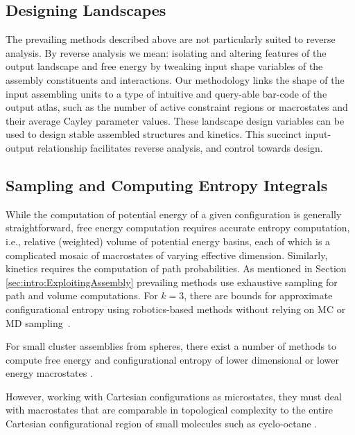 \documentclass[]{article}
\begin{document}
\subsection{Designing Landscapes} 
\label{sec:intro:designingAssembly} 
The prevailing methods described above are not particularly suited to reverse
analysis. By reverse analysis we mean: isolating and altering features of the
output landscape and free energy by tweaking input shape variables of the
assembly constituents and interactions. Our methodology links the shape of the
input assembling units to a type of intuitive and query-able bar-code of the
output atlas, such as the number of active constraint regions or macrostates
and their average Cayley parameter values. These landscape design variables
can be used to design stable assembled structures and kinetics. This succinct
input-output relationship facilitates reverse analysis, and control towards
design.

\subsection{Sampling and Computing Entropy Integrals} 
\label{sec:intro:VolumeIntegrals}
While the computation of potential energy of a given configuration is generally
straightforward, free energy computation requires accurate entropy computation,
i.e., relative (weighted) volume of potential energy basins, each of which is a
complicated mosaic of macrostates of varying effective dimension. Similarly,
kinetics requires the computation of path probabilities. As mentioned in
Section \ref{sec:intro:ExploitingAssembly} prevailing methods use exhaustive
sampling for path and volume computations. For $k=3$, there are bounds for
approximate configurational entropy using robotics-based methods without
relying on MC or MD sampling~\cite{GregoryS201199}. 

For small cluster assemblies from spheres, there exist a number of methods to
compute free energy and configurational entropy of lower dimensional or lower
energy macrostates \cite{Holmes-Cerfon2013, Arkus2009, Wales2010,
Beltran-Villegas2011, Calvo2012, Khan2012, Hoy2012, Hoy2014,
Holmes-Cerfon-2018}.

However, working with Cartesian configurations as microstates, they must deal
with macrostates that are comparable in topological complexity to the entire
Cartesian configurational region of small molecules such as cyclo-octane
\cite{Martin2010,Jaillet2017,Porta2007}.
\end{document}
